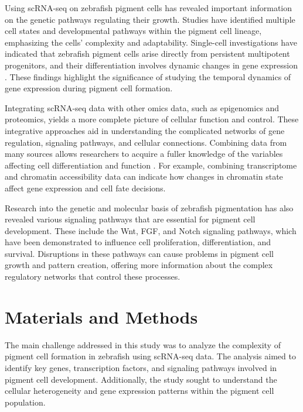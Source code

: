 \documentclass[runningheads]{llncs}
\begin{document}
Using scRNA-seq on zebrafish pigment cells has revealed important information on the genetic pathways regulating their growth. Studies have identified multiple cell states and developmental pathways within the pigment cell lineage, emphasizing the cells' complexity and adaptability. Single-cell investigations have indicated that zebrafish pigment cells arise directly from persistent multipotent progenitors, and their differentiation involves dynamic changes in gene expression \cite{subkhankulova2023zebrafish}. These findings highlight the significance of studying the temporal dynamics of gene expression during pigment cell formation.

Integrating scRNA-seq data with other omics data, such as epigenomics and proteomics, yields a more complete picture of cellular function and control. These integrative approaches aid in understanding the complicated networks of gene regulation, signaling pathways, and cellular connections. Combining data from many sources allows researchers to acquire a fuller knowledge of the variables affecting cell differentiation and function \cite{stuart2019comprehensive,jang2021epigenetic}. For example, combining transcriptome and chromatin accessibility data can indicate how changes in chromatin state affect gene expression and cell fate decisions.

Research into the genetic and molecular basis of zebrafish pigmentation has also revealed various signaling pathways that are essential for pigment cell development. These include the Wnt, FGF, and Notch signaling pathways, which have been demonstrated to influence cell proliferation, differentiation, and survival\cite{budi2008embryonic}. Disruptions in these pathways can cause problems in pigment cell growth and pattern creation, offering more information about the complex regulatory networks that control these processes\cite{camargo2019endothelin}.

\section{Materials and Methods}
The main challenge addressed in this study was to analyze the complexity of pigment cell formation in zebrafish using scRNA-seq data. The analysis aimed to identify key genes, transcription factors, and signaling pathways involved in pigment cell development. Additionally, the study sought to understand the cellular heterogeneity and gene expression patterns within the pigment cell population.
\end{document}

